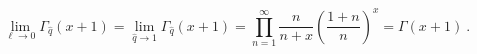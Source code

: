 \begin{equation}
\lim_{\ell \rightarrow 0}\Gamma _{\hat{q}}(x+1)=\lim_{\hat{q}\rightarrow
1}\Gamma _{\hat{q}}(x+1)=\prod\limits_{n=1}^{\infty }\frac{n}{n+x}\left( 
\frac{1+n}{n}\right) ^{x}=\Gamma (x+1)~.\qquad  \label{gqn}
\end{equation}%
